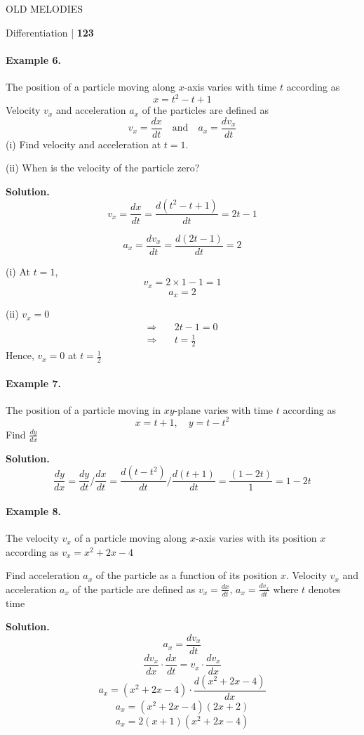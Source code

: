 


OLD MELODIES

\noindent Differentiation | \textbf{123}

\paragraph{Example 6.} The position of a particle moving along \(x\)-axis varies with time \( t \)
according as 
\[
x = t^2 - t + 1
\]
Velocity \( v_x \) and acceleration \( a_x \) of the particles are defined as
\[
v_x = \frac{dx}{dt} \quad \text{and} \quad a_x = \frac{dv_x}{dt}
\]
(i) Find velocity and acceleration at \( t = 1 \).

(ii) When is the velocity of the particle zero?

\noindent \textbf{Solution.} 
\[
v_x = \frac{dx}{dt} = \frac{d(t^2 - t + 1)}{dt} = 2t - 1
\]

\[
a_x = \frac{dv_x}{dt} = \frac{d(2t - 1)}{dt} = 2
\]

(i) At \( t = 1 \),
\[
v_x = 2 \times 1 - 1 = 1
\]
\[
a_x = 2
\]

(ii) \( v_x = 0 \)
\begin{align*}
\Rightarrow & \quad 2t - 1 = 0 \\
\Rightarrow & \quad t = \frac{1}{2} 
\end{align*}
Hence, \( v_x = 0 \) at \( t = \frac{1}{2} \)

\paragraph{Example 7.} The position of a particle moving in \( xy \)-plane varies with time \( t \)
according as 
\[
x = t + 1, \quad y = t - t^2
\]
Find \(\frac{dy}{dx}\)

\noindent \textbf{Solution.} 
\[
\frac{dy}{dx} = \frac{dy}{dt} \bigg/ \frac{dx}{dt} = \frac{d(t - t^2)}{dt} \bigg/ \frac{d(t + 1)}{dt} = \frac{(1 - 2t)}{1} = 1 - 2t
\]

\paragraph{Example 8.} The velocity \( v_x \) of a particle moving along \( x \)-axis varies with its
position \( x \) according as \( v_x = x^2 + 2x - 4 \)

Find acceleration \( a_x \) of the particle as a function of its position \( x \). Velocity \( v_x \) and acceleration \( a_x \) of the particle are defined as \( v_x = \frac{dx}{dt}, \, a_x = \frac{dv_x}{dt} \) where \( t \) denotes time

\noindent \textbf{Solution.} 
\[
a_x = \frac{dv_x}{dt}
\]
\[
\frac{dv_x}{dx} \cdot \frac{dx}{dt} = v_x \cdot \frac{dv_x}{dx}
\]
\[
a_x = (x^2 + 2x - 4) \cdot \frac{d (x^2 + 2x - 4)}{dx}
\]
\[
a_x = (x^2 + 2x - 4)(2x + 2)
\]
\[
a_x = 2 (x + 1) (x^2 + 2x - 4)
\]

